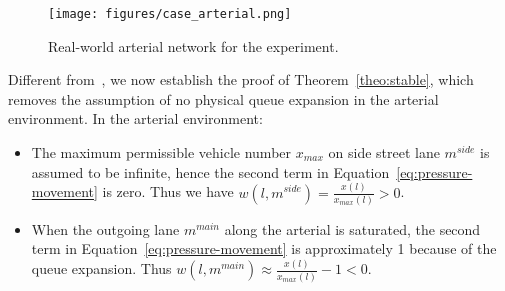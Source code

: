 \begin{figure*}[t!]
  \centering
    \texttt{[image: figures/case\_arterial.png]}
     \caption{Real-world arterial network for the experiment.}
    \label{fig:real-intersection}
\end{figure*}

Different from~\cite{MP13}, we now establish the proof of Theorem~\ref{theo:stable}, which removes the assumption of no physical queue expansion in the arterial environment. In the arterial environment:
\begin{itemize}[wide,noitemsep,topsep=0pt]
    \item The maximum permissible vehicle number $x_{max}$ on side street lane $m^{side}$ is assumed to be infinite, hence the second term in Equation~\eqref{eq:pressure-movement} is zero. Thus we have $w(l,m^{side})=\frac{x(l)}{x_{max}(l)}>0$.
    \item When the outgoing lane $m^{main}$ along the arterial is saturated, the second term in Equation~\eqref{eq:pressure-movement} is approximately 1 because of the queue expansion. Thus $w(l,m^{main})\approx \frac{x(l)}{x_{max}(l)} -1 < 0$. 
\end{itemize}

